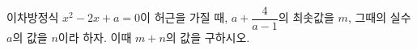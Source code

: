 이차방정식 $x^2-2x+a=0$이 허근을 가질 때, $a+\dfrac{4}{a-1}$의 최솟값을 $m$, 그때의 실수 $a$의 값을 $n$이라 하자. 이때 $m+n$의 값을 구하시오.
